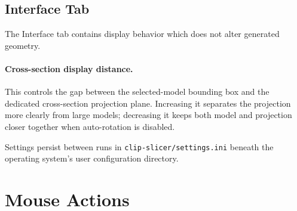\subsection{Interface Tab}
\label{settings-interface}

The Interface tab contains display behavior which does not alter generated
geometry.

\paragraph{Cross-section display distance.}
This controls the gap between the selected-model bounding box and the dedicated
cross-section projection plane. Increasing it separates the projection more
clearly from large models; decreasing it keeps both model and projection closer
together when auto-rotation is disabled.

Settings persist between runs in \texttt{clip-slicer/settings.ini} beneath the
operating system's user configuration directory.

\section{Mouse Actions}
\label{mouse-actions}

